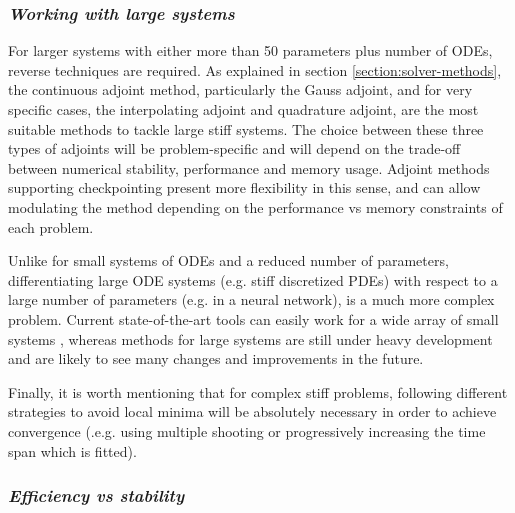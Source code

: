 \subsubsection*{\textit{Working with large systems}}

For larger systems with either more than 50 parameters plus number of ODEs, reverse techniques are required. 
As explained in section \ref{section:solver-methods}, the continuous adjoint method, particularly the Gauss adjoint, and for very specific cases, the interpolating adjoint and quadrature adjoint, are the most suitable methods to tackle large stiff systems. 
The choice between these three types of adjoints will be problem-specific and will depend on the trade-off between numerical stability, performance and memory usage. 
Adjoint methods supporting checkpointing present more flexibility in this sense, and can allow modulating the method depending on the performance vs memory constraints of each problem. 

Unlike for small systems of ODEs and a reduced number of parameters, differentiating large ODE systems (e.g. stiff discretized PDEs) with respect to a large number of parameters (e.g. in a neural network), is a much more complex problem. 
Current state-of-the-art tools can easily work for a wide array of small systems \cite{rackauckas2020universal}, whereas methods for large systems are still under heavy development and are likely to see many changes and improvements in the future.

Finally, it is worth mentioning that for complex stiff problems, following different strategies to avoid local minima will be absolutely necessary in order to achieve convergence (.e.g. using multiple shooting \cite{Kiehl:2006tb, Boussange2024} or progressively increasing the time span which is fitted).

\subsubsection*{\textit{Efficiency vs stability}}

